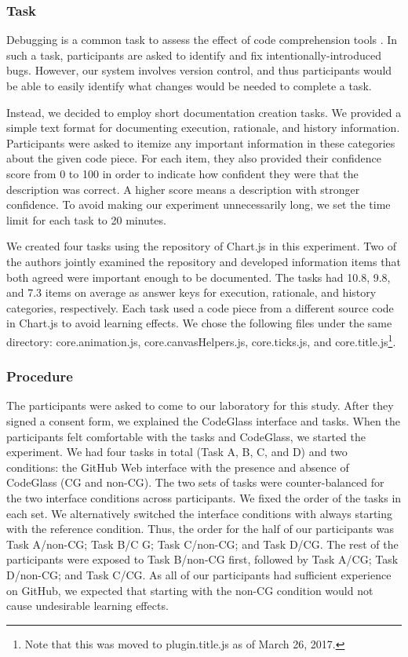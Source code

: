 \subsubsection{Task}
Debugging is a common task to assess the effect of code comprehension tools \cite{Code_Bubbles,Improving_API_Documentation_Usability_with_Knowledge_Pushing}.
In such a task, participants are asked to identify and fix intentionally-introduced bugs.
However, our system involves version control, and thus participants would be able to easily identify what changes would be needed to complete a task.



Instead, we decided to employ short documentation creation tasks.
We provided a simple text format for documenting execution, rationale, and history information.
Participants were asked to itemize any important information in these categories about the given code piece.
For each item, they also provided their confidence score from 0 to 100 in order to indicate how confident they were that the description was correct.
A higher score means a description with stronger confidence.
To avoid making our experiment unnecessarily long, we set the time limit for each task to 20 minutes.

We created four tasks using the repository of Chart.js in this experiment.
Two of the authors jointly examined the repository and developed information items that both agreed were important enough to be documented.
The tasks had 10.8, 9.8, and 7.3 items on average as answer keys for execution, rationale, and history categories, respectively.
Each task used a code piece from a different source code in Chart.js to avoid learning effects.
We chose the following files under the same directory: core.animation.js, core.canvasHelpers.js, core.ticks.js, and core.title.js\footnote{Note that this was moved to plugin.title.js as of March 26, 2017.}. 


\subsubsection{Procedure}
The participants were asked to come to our laboratory for this study.
After they signed a consent form, we explained the CodeGlass interface and tasks.
When the participants felt comfortable with the tasks and CodeGlass, we started the experiment.
We had four tasks in total (Task A, B, C, and D) and two conditions: the GitHub Web interface with the presence and absence of CodeGlass (CG and non-CG).
The two sets of tasks were counter-balanced for the two interface conditions across participants.
We fixed the order of the tasks in each set.
We alternatively switched the interface conditions with always starting with the reference condition.
Thus, the order for the half of our participants was Task A/non-CG; Task B/C
G; Task C/non-CG; and Task D/CG. 
The rest of the participants were exposed to Task B/non-CG first, followed by Task A/CG; Task D/non-CG; and Task C/CG. 
As all of our participants had sufficient experience on GitHub, we expected that starting with the non-CG condition would not cause undesirable learning effects.

